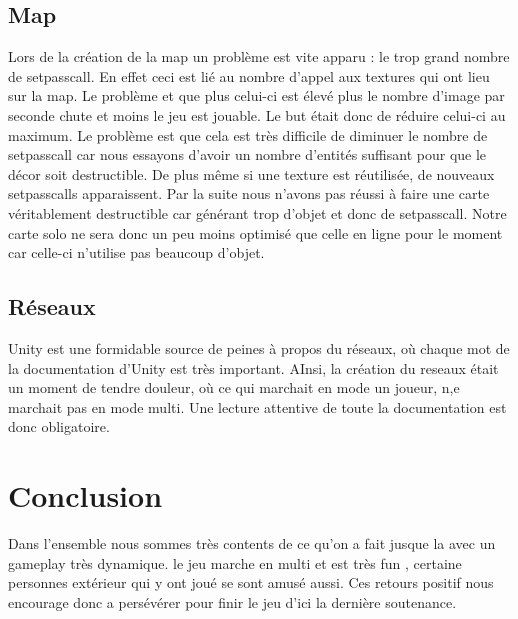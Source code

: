 ﻿\documentclass[12pt]{article}
\begin{document}
\subsection {Map}
Lors de la création de la map un problème est vite apparu : le trop grand nombre de setpasscall. En effet ceci est lié au nombre d'appel aux textures qui ont lieu sur la map.
Le problème et que plus celui-ci est élevé plus le nombre d'image par seconde chute et moins le jeu est jouable. Le but était donc de réduire celui-ci au maximum.
Le problème est que cela est très difficile de diminuer le nombre de setpasscall car nous essayons d'avoir un nombre d'entités suffisant pour que le décor soit destructible.
De plus même si une texture est réutilisée, de nouveaux setpasscalls apparaissent. Par la suite nous n'avons pas réussi à faire une carte véritablement destructible car générant trop d'objet et donc de setpasscall.
Notre carte solo ne sera donc un peu moins optimisé que celle en ligne pour le moment car celle-ci n'utilise pas beaucoup d'objet.

\subsection {Réseaux}
Unity est une formidable source de peines à propos du réseaux, où chaque mot de la documentation  d'Unity est très important. AInsi, la création du reseaux était un moment de tendre douleur, où ce qui marchait en mode un joueur, n,e marchait pas en mode multi. Une lecture attentive de toute la documentation est donc obligatoire.

\section{Conclusion}
Dans l'ensemble nous sommes très contents de ce qu'on a fait jusque la avec un gameplay très dynamique. le jeu marche en multi et est très fun , certaine personnes extérieur qui y ont joué se sont amusé aussi. Ces retours positif nous encourage donc a persévérer pour finir le jeu d'ici la dernière soutenance.
\end{document}
